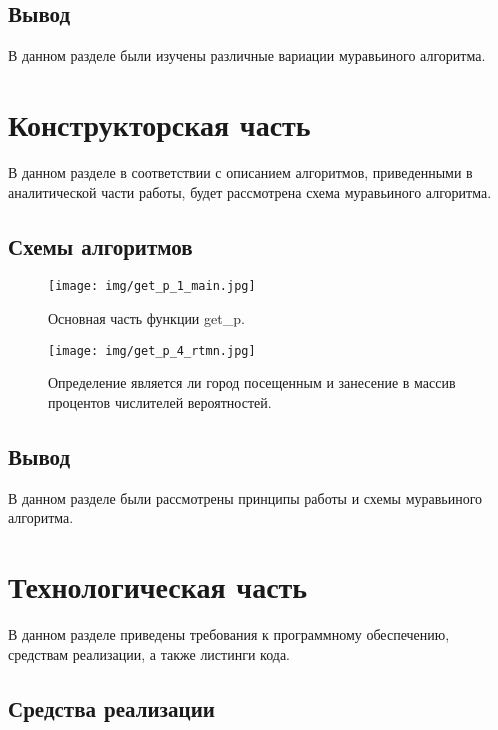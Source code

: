 \documentclass[12pt, a4paper]{report}
\begin{document}
	\section{Вывод}
	
	В данном разделе были изучены различные вариации муравьиного алгоритма.

	\chapter{Конструкторская часть}
	
	В данном разделе в соответствии с описанием алгоритмов, приведенными в аналитической части работы, будет рассмотрена схема муравьиного
	алгоритма.
	
	\section{Схемы алгоритмов}
	
	\begin{figure}[ht!]
		\center
		\texttt{[image: img/get\_p\_1\_main.jpg]}
		\caption{Основная часть функции get\_p.}
		\label{ris:get_p_1}
	\end{figure}
	
	\begin{figure}[ht!]
		\center
		\texttt{[image: img/get\_p\_4\_rtmn.jpg]}
		\caption{Определение является ли город посещенным и занесение в массив процентов числителей вероятностей.}
		\label{ris:get_p_4}
	\end{figure}

	\section{Вывод}
	
	В данном разделе были рассмотрены принципы работы и схемы муравьиного алгоритма.
	
    \chapter{Технологическая часть}
    
    В данном разделе приведены требования к программному обеспечению, средствам реализации, а также листинги кода.
    
    \section{Средства реализации}
    
\end{document}
